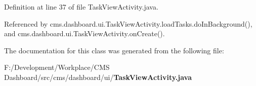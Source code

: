 \-Definition at line 37 of file \-Task\-View\-Activity.\-java.



\-Referenced by cms.\-dashboard.\-ui.\-Task\-View\-Activity.\-load\-Tasks.\-do\-In\-Background(), and cms.\-dashboard.\-ui.\-Task\-View\-Activity.\-on\-Create().



\-The documentation for this class was generated from the following file\-:\begin{DoxyCompactItemize}
\item 
\-F\-:/\-Development/\-Workplace/\-C\-M\-S Dashboard/src/cms/dashboard/ui/{\bf \-Task\-View\-Activity.\-java}\end{DoxyCompactItemize}
